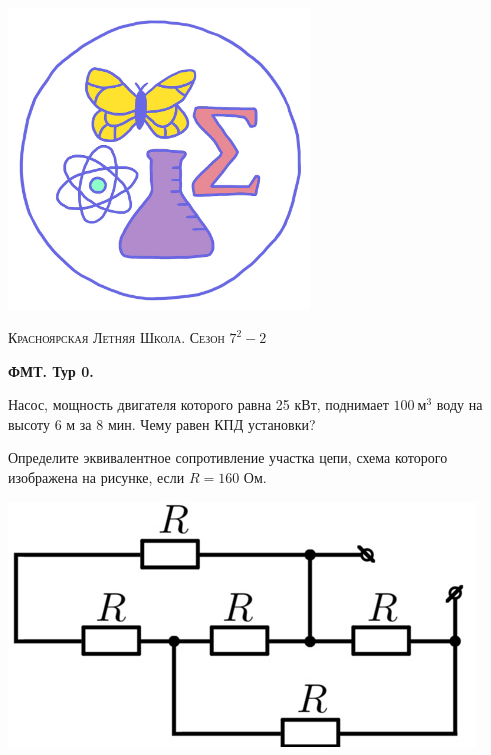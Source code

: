 \colorbox{white!10!}{
    \begin{minipage}{0.2\textwidth}
       \begin{flushleft}
        \includegraphics[width = 0.6\textwidth]{Эмблема.png}
       \end{flushleft}
    \end{minipage}
    \begin{minipage}[t]{0.7 \textwidth}
        \begin{center}
            {\huge \textsc{Красноярская Летняя Школа. Сезон $7^2 - 2$}}
            \vspace{0.25cm}
            
            { \huge \textbf{ФМТ. Тур 0.}}
        \end{center}
        \vspace{0.05cm}
    \end{minipage}
}

\begin{enumerate}
    \item Насос, мощность двигателя которого равна 25 кВт, поднимает $100\ \text{м}^3$ воду на высоту 6 м за 8 мин. Чему равен КПД установки?

    \parbox[b]{.7\textwidth}{%
    \item Определите эквивалентное сопротивление участка цепи, схема которого изображена на рисунке, если $R = 160$ Ом.   
    }\hfill\includegraphics[width=.25\textwidth]{pictures/Tur_0.png}
\end{enumerate}